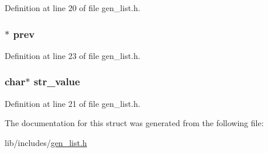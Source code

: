 Definition at line 20 of file gen\-\_\-list.\-h.

\hypertarget{structs__list_a58d5321b61e8202cbad3ede333207719}{
\subsubsection[{prev}]{$\ast$ prev}}\label{structs__list_a58d5321b61e8202cbad3ede333207719}


Definition at line 23 of file gen\-\_\-list.\-h.

\hypertarget{structs__list_a50b6bdca20b777174be4fbdb217ca8d6}{
\subsubsection[{str\-\_\-value}]{\setlength{\rightskip}{0pt plus 5cm}char$\ast$ str\-\_\-value}}\label{structs__list_a50b6bdca20b777174be4fbdb217ca8d6}


Definition at line 21 of file gen\-\_\-list.\-h.



The documentation for this struct was generated from the following file\-:\begin{DoxyCompactItemize}
\item 
lib/includes/\hyperlink{gen__list_8h}{gen\-\_\-list.\-h}\end{DoxyCompactItemize}
